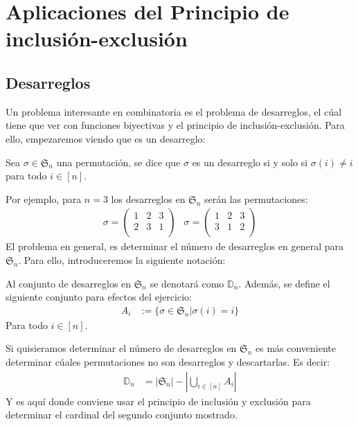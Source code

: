 \documentclass[12pt,a4paper,oneside]{memoir}
\begin{document}
\section*{Aplicaciones del Principio de inclusión-exclusión}
\subsection*{Desarreglos}
Un problema interesante en combinatoria es el problema de desarreglos, el cúal tiene que ver con funciones biyectivas y el principio de inclusión-exclusión. Para ello, empezaremos viendo que es un desarreglo:
\begin{definition}[Desarreglo]
    Sea $\sigma \in \mathfrak{S}_n$ una permutación, se dice que $\sigma$ es un desarreglo si y solo si $\sigma(i) \neq i$ para todo $i \in [n]$.
\end{definition}
Por ejemplo, para $n=3$ los desarreglos en $\mathfrak{S}_n$ serán las permutaciones:
$$\begin{matrix}
    \sigma = \begin{pmatrix}
        1 & 2 & 3\\
        2 & 3 & 1\\
    \end{pmatrix} & \sigma = \begin{pmatrix}
        1 & 2 & 3\\
        3 & 1 & 2\\
    \end{pmatrix}
\end{matrix}$$
El problema en general, es determinar el número de desarreglos en general para $\mathfrak{S}_n$. Para ello, introduceremos la siguiente notación:
\begin{notation}
    Al conjunto de desarreglos en $\mathfrak{S}_n$ se denotará como $\mathbb{D}_n$. Además, se define el siguiente conjunto para efectos del ejercicio:
    \begin{align*}
        A_i &:= \{\sigma \in \mathfrak{S}_n | \sigma(i) = i\}
    \end{align*}
    Para todo $i \in [n]$.
\end{notation}
Si quisieramos determinar el número de desarreglos en $\mathfrak{S}_n$ es más conveniente determinar cúales permutaciones no son desarreglos y descartarlas. Es decir:
\begin{align*}
    \mathbb{D}_n &= |\mathfrak{S}_n| - \left|\bigcup_{i \in [n]} A_i\right|
\end{align*}
Y es aquí donde conviene usar el principio de inclusión y exclusión para determinar el cardinal del segundo conjunto mostrado. 
\end{document}
